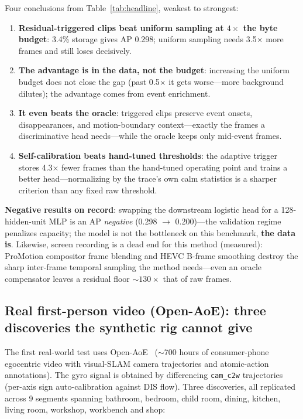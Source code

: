 \documentclass[12pt,a4paper]{article}
\begin{document}
Four conclusions from Table~\ref{tab:headline}, weakest to strongest:

\begin{enumerate}
  \item \textbf{Residual-triggered clips beat uniform sampling at $4\times$ the byte budget}: 3.4\% storage gives AP 0.298; uniform sampling needs 3.5$\times$ more frames and still loses decisively.
  \item \textbf{The advantage is in the data, not the budget}: increasing the uniform budget does not close the gap (past 0.5$\times$ it gets worse---more background dilutes); the advantage comes from event enrichment.
  \item \textbf{It even beats the oracle}: triggered clips preserve event onsets, disappearances, and motion-boundary context---exactly the frames a discriminative head needs---while the oracle keeps only mid-event frames.
  \item \textbf{Self-calibration beats hand-tuned thresholds}: the adaptive trigger stores 4.3$\times$ fewer frames than the hand-tuned operating point and trains a better head---normalizing by the trace's own calm statistics is a sharper criterion than any fixed raw threshold.
\end{enumerate}

\textbf{Negative results on record}: swapping the downstream logistic head for a 128-hidden-unit MLP is an AP \emph{negative} (0.298 $\to$ 0.200)---the validation regime penalizes capacity; the model is not the bottleneck on this benchmark, \textbf{the data is}. Likewise, screen recording is a dead end for this method (measured): ProMotion compositor frame blending and HEVC B-frame smoothing destroy the sharp inter-frame temporal sampling the method needs---even an oracle compensator leaves a residual floor ${\sim}130\times$ that of raw frames.

\subsection{Real first-person video (Open-AoE): three discoveries the synthetic rig cannot give}
\label{sec:realdata}

The first real-world test uses Open-AoE~\cite{openaoe} (${\sim}$700 hours of consumer-phone egocentric video with visual-SLAM camera trajectories and atomic-action annotations). The gyro signal is obtained by differencing \texttt{cam\_c2w} trajectories (per-axis sign auto-calibration against DIS flow). Three discoveries, all replicated across 9 segments spanning bathroom, bedroom, child room, dining, kitchen, living room,
workshop, workbench and shop:
\end{document}
